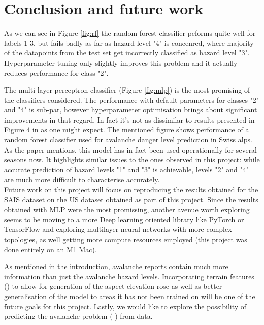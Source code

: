 \documentclass{article}
\begin{document}
\section{Conclusion and future work}
	As we can see in Figure \ref{fig:rf} the random forest classifier peforms quite well for labels 1-3, but fails badly as far as hazard level "4" is concenred, where majority of the datapoints from the test set get incorrectly classified as hazard level "3". Hyperparameter tuning only slightly improves this problem and it actually reduces performance for class "2".

	The multi-layer perceptron classifier (Figure \ref{fig:mlp}) is the most promising of the classifiers considered. The performance with default parameters for classes "2" and "4" is sub-par, however hyperparameter optimisation brings about significant improvements in that regard.
	In fact it's not as dissimilar to results presented in Figure 4 in \cite{egusphere-2024-2374} as one might expect. The mentioned figure shows performance of a random forest classifier used for avalanche danger level prediction in Swiss alps. As the paper mentions, this model has in fact been used operationally for several seasons now. It highlights similar issues to the ones observed in this project: while accurate prediction of hazard levels "1" and "3" is achievable, levels "2" and "4" are much more difficult to characterise accurately. \\

	Future work on this project will focus on reproducing the results obtained for the SAIS dataset on the US dataset obtained as part of this project. Since the results obtained with MLP were the most promissing, another avenue worth exploring seems to be moving to a more Deep learning oriented library like PyTorch or TensorFlow and exploring multilayer neural networks with more complex topologies, as well getting more compute resources employed (this project was done entirely on an M1 Mac).

	As mentioned in the introduction, avalanche reports contain much more information than just the avalanche hazard levels. Incorporating terrain features (\cite{egusphere-2023-2948}) to allow for generation of the aspect-elevation rose as well as better generalisation of the model to areas it has not been trained on will be one of the future goals for this project. Lastly, we would like to explore the possibility of predicting the avalanche problem (\cite{MORIN2020102910} \cite{REUTER2022103462}) from data.
\end{document}
